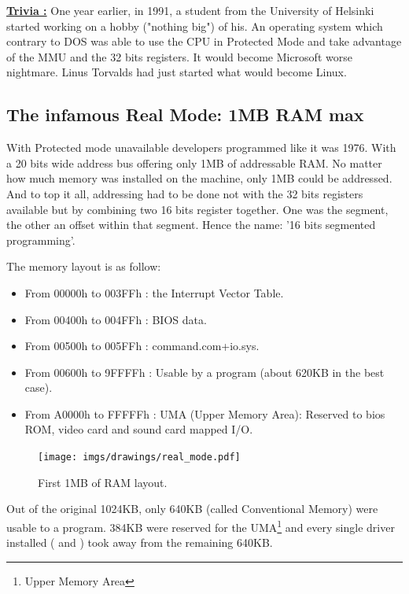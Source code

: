 \documentclass[book.tex]{subfiles}
\begin{document}
\bigskip

 \textbf{\underline{Trivia :}} One year earlier, in 1991, a student from the University of Helsinki started working on a hobby ("nothing big") of his. An operating system which contrary to DOS was able to use the CPU in Protected Mode and take advantage of the MMU and the 32 bits registers. It would become Microsoft worse nightmare. Linus Torvalds had just started what would become Linux.



  \subsection{The infamous Real Mode: 1MB RAM max}
  With Protected mode unavailable developers programmed like it was 1976. With a 20 bits wide address bus offering only 1MB of addressable RAM. No matter how much memory was installed on the machine, only 1MB could be addressed. And to top it all, addressing had to be done not with the 32 bits registers available but by combining two 16 bits register together. One was the segment, the other an offset within that segment. Hence the name: '16 bits segmented programming'.

  \bigskip
The memory layout is as follow:\\
\begin{itemize}
\item From 00000h to 003FFh : the Interrupt Vector Table.
\item From 00400h to 004FFh : BIOS data.
\item From 00500h to 005FFh : command.com+io.sys.
\item From 00600h to 9FFFFh : Usable by a program (about 620KB in the best case). 
\item From A0000h to FFFFFh : UMA (Upper Memory Area): Reserved to bios ROM, video card and sound card mapped I/O.
\end{itemize}

\begin{figure}[H]
\centering
\texttt{[image: imgs/drawings/real\_mode.pdf]}

\caption{First 1MB of RAM layout.}
\label{fig:fp_internals}
\end{figure}


Out of the original 1024KB, only 640KB (called Conventional Memory) were usable to a program. 384KB were reserved for the UMA\footnote{Upper Memory Area} and every single driver installed ( and )  took away from the remaining 640KB.
\end{document}
